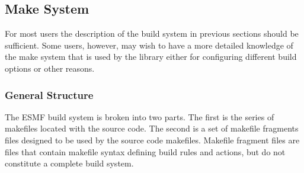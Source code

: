 

\subsection{Make System}
\label{sec:make}
For most users the description of the build system in previous
sections should be sufficient.  Some users, however, may wish to have a
more detailed knowledge of the make system that is used by the library
either for configuring different build options or other reasons.
\subsubsection{General Structure}

The ESMF build system is broken into two parts.  The first is the
series of makefiles located with the source code.  The second is a set
of makefile fragments files designed to be used by the source code
makefiles.  Makefile fragment files are files that contain makefile
syntax defining build rules and actions, but do not constitute a
complete build system.

